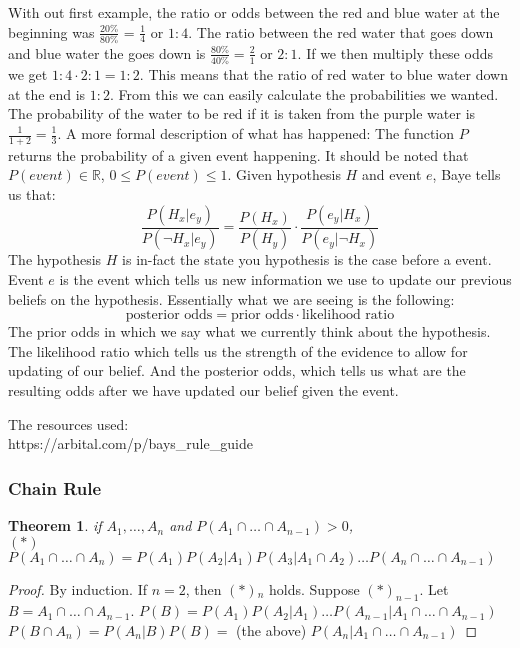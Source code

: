 \documentclass{article}
\newtheorem{theorem}{Theorem}
\newtheorem{proof}{Proof}
\newcommand{\R}{ \mathbb{R} }
\begin{document}
With out first example, the ratio or odds between the red and blue water at the 
beginning was $\frac{20\%}{80\%}$ =  $\frac{1}{4}$ or $1 : 4$. The ratio between
the red water that goes down and blue water the goes down is 
$\frac{80\%}{40\%} = \frac{2}{1}$ or $2 : 1$. If we then multiply these odds we 
get $1 : 4 \cdot 2 : 1 = 1 : 2$. This means that the ratio of red water to blue 
water down at the end is $1 : 2$.  From this we can easily calculate the probabilities
we wanted. The probability of the water to be red if it is taken from the purple 
water is  $\frac{1}{1 + 2} = \frac{1}{3}$. A more formal description of what has happened: 
The function $P$ returns the probability of a given event happening. It should 
be noted that $P(event) \in \R $,  $0 \le P(event) \le  1$. Given hypothesis $H$ and 
event $e$, Baye tells us that: 
\[
    \frac{P(H_x | e_y)}{P(\neg H_x | e_y)} = \frac{P(H_x)}{P(H_y)} \cdot \frac{P(e_y | H_x)}{P(e_y | \neg H_x)} 
\]
The hypothesis $H$ is in-fact the state you hypothesis is the case before a event. 
Event $e$ is the event which tells us new information we use to update our previous
beliefs on the hypothesis. Essentially what we are seeing is the following: 
\[
    \text{posterior odds} = \text{prior odds} \cdot \text{likelihood ratio}
\] 
The prior odds in which we say what we currently think about the hypothesis. The 
likelihood ratio which tells us the strength of the evidence to allow for updating 
of our belief. And the posterior odds, which tells us what are the resulting odds 
after we have updated our belief given the event. 

\begin{mdframed} The resources used: \\
https://arbital.com/p/bays\_rule\_guide \\ 
\end{mdframed}

\subsubsection{Chain Rule}
\begin{theorem}
if $A_1, \dots, A_n$  and $P(A_1 \cap \dots \cap A_{n-1}) > 0$, \\
$(*)$ $P(A_1 \cap \dots \cap A_{n}) = P(A_1)P(A_2 | A_1)P(A_3 | A_1 \cap A_2) \dots P(A_n \cap \dots \cap A_{n-1})$  \\
\end{theorem}
\begin{proof}
    By induction. If $n=2$, then $(*){_n}$  holds.  Suppose $(*)_{n-1}$.
    Let $B = A_1 \cap \dots \cap A_{n-1}.$ $P(B) = P(A_1)P(A_2 | A_1) \dots P(A_{n-1} | A_1 \cap \dots \cap A_{n-1})$ \\
    $P(B \cap A_n) =  P(A_n | B)P(B) = $ (the above) $P(A_n | A_1 \cap \dots \cap A_{n-1}) $
\end{proof}
\end{document}
